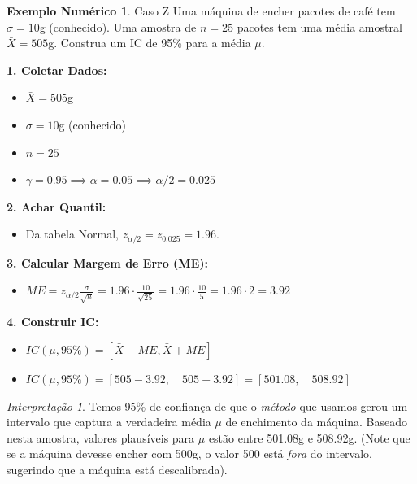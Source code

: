 \documentclass[12pt, a4paper]{article}
\theoremstyle{definition} %
\newtheorem{exemplo}{Exemplo Numérico}[section]
\theoremstyle{remark} %
\newtheorem{interpretacao}{Interpretação}[section]
\begin{document}
\begin{exemplo}{Caso Z}
    Uma máquina de encher pacotes de café tem $\sigma=10$g (conhecido). Uma amostra de $n=25$ pacotes tem uma média amostral $\bar{X}=505$g. Construa um IC de 95\% para a média $\mu$.

    \textbf{1. Coletar Dados:}
    \begin{itemize}
        \item $\bar{X} = 505$g
        \item $\sigma = 10$g (conhecido)
        \item $n = 25$
        \item $\gamma = 0.95 \implies \alpha = 0.05 \implies \alpha/2 = 0.025$
    \end{itemize}
    \textbf{2. Achar Quantil:}
    \begin{itemize}
        \item Da tabela Normal, $z_{\alpha/2} = z_{0.025} = 1.96$.
    \end{itemize}
    \textbf{3. Calcular Margem de Erro (ME):}
    \begin{itemize}
        \item $ME = z_{\alpha/2} \frac{\sigma}{\sqrt{n}} = 1.96 \cdot \frac{10}{\sqrt{25}} = 1.96 \cdot \frac{10}{5} = 1.96 \cdot 2 = 3.92$
    \end{itemize}
    \textbf{4. Construir IC:}
    \begin{itemize}
        \item $IC(\mu, 95\%) = [\bar{X} - ME, \bar{X} + ME]$
        \item $IC(\mu, 95\%) = [505 - 3.92, \quad 505 + 3.92] = [501.08, \quad 508.92]$
    \end{itemize}
    \begin{interpretacao}
        Temos 95\% de confiança de que o \textit{método} que usamos gerou um intervalo que captura a verdadeira média $\mu$ de enchimento da máquina. Baseado nesta amostra, valores plausíveis para $\mu$ estão entre 501.08g e 508.92g. (Note que se a máquina devesse encher com 500g, o valor 500 está \textit{fora} do intervalo, sugerindo que a máquina está descalibrada).
    \end{interpretacao}
\end{exemplo}
\end{document}
